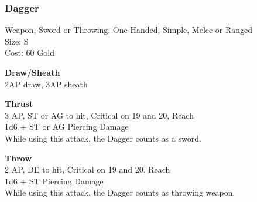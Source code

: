 \subsubsection{Dagger}\label{weapon:dagger}
Weapon, Sword or Throwing, One-Handed, Simple, Melee or Ranged\\
Size: S\\
Cost: 60 Gold

\textbf{Draw/Sheath}\\
2AP draw, 3AP sheath

\textbf{Thrust} \\
3 AP, ST or AG to hit, Critical on 19 and 20,  Reach\\
1d6 + \texttimes ST or AG Piercing Damage\\
While using this attack, the Dagger counts as a sword.

\textbf{Throw} \\
2 AP, DE to hit, Critical on 19 and 20,  Reach\\
1d6 + \texttimes ST Piercing Damage\\
While using this attack, the Dagger counts as throwing weapon.

